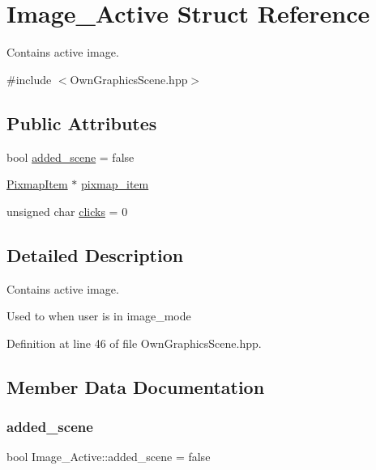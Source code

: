 \hypertarget{structImage__Active}{}\section{Image\+\_\+\+Active Struct Reference}
\label{structImage__Active}


Contains active image.  




{\ttfamily \#include $<$Own\+Graphics\+Scene.\+hpp$>$}

\subsection*{Public Attributes}
\begin{DoxyCompactItemize}
\item 
bool \mbox{\hyperlink{structImage__Active_ac5eb10f5ca4ad81766c92a6ede6f7853}{added\+\_\+scene}} = false
\item 
\mbox{\hyperlink{classPixmapItem}{Pixmap\+Item}} $\ast$ \mbox{\hyperlink{structImage__Active_aa007ea3c9ba4830bbc2706af51820c20}{pixmap\+\_\+item}}
\item 
unsigned char \mbox{\hyperlink{structImage__Active_abb039226daf0372a8d88c842f5eb140f}{clicks}} = 0
\end{DoxyCompactItemize}


\subsection{Detailed Description}
Contains active image. 

Used to when user is in image\+\_\+mode 

Definition at line 46 of file Own\+Graphics\+Scene.\+hpp.



\subsection{Member Data Documentation}
\mbox{\label{structImage__Active_ac5eb10f5ca4ad81766c92a6ede6f7853}} 
\subsubsection{\texorpdfstring{added\+\_\+scene}{added\_scene}}
{\footnotesize\ttfamily bool Image\+\_\+\+Active\+::added\+\_\+scene = false}


